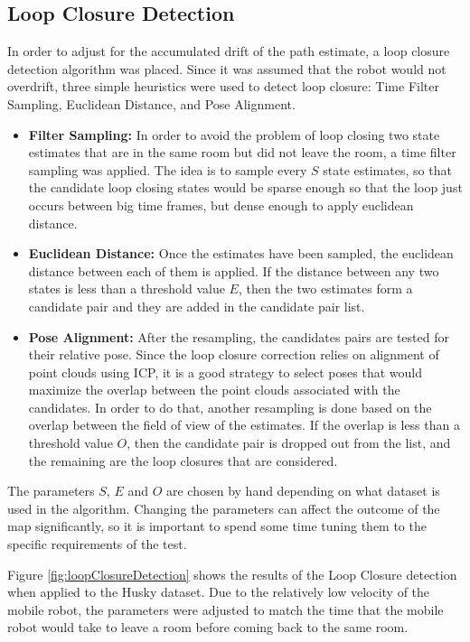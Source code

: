 \documentclass[12pt]{article}
\begin{document}
	\subsection{Loop Closure Detection}
	\label{subs:LoopCl}

In order to adjust for the accumulated drift of the path estimate, a loop closure detection algorithm was placed. Since it was assumed that the robot would not overdrift, three simple heuristics were used to detect loop closure: Time Filter Sampling, Euclidean Distance, and Pose Alignment. 

\begin{itemize}
\item \textbf{Filter Sampling:} In order to avoid the problem of loop closing two state estimates that are in the same room but did not leave the room, a time filter sampling was applied. The idea is to sample every $S$ state estimates, so that the candidate loop closing states would be sparse enough so that the loop just occurs between big time frames, but dense enough to apply euclidean distance.
\item \textbf{Euclidean Distance:} Once the estimates have been  sampled, the euclidean distance between each of them is applied. If the distance between any two states is less than a threshold value $E$, then the two estimates form a candidate pair and they are added in the candidate pair list.
\item \textbf{Pose Alignment:} After the resampling, the candidates pairs are tested for their relative pose. Since the loop closure correction relies on alignment of point clouds using ICP, it is a good strategy to select poses that would maximize the overlap between the point clouds associated with the candidates. In order to do that, another resampling is done based on the overlap between the field of view of the estimates. If the overlap is less than a threshold value $O$, then the candidate pair is dropped out from the list, and the remaining are the loop closures that are considered.
\end{itemize}
	
The parameters $S$, $E$ and $O$ are chosen by hand depending on what dataset is used in the algorithm. Changing the parameters can affect the outcome of the map significantly, so it is important to spend some time tuning them to the specific requirements of the test.
	
Figure \ref{fig:loopClosureDetection} shows the results of the Loop Closure detection when applied to the Husky dataset. Due to the relatively low velocity of the mobile robot, the parameters were adjusted to match the time that the mobile robot would take to leave a room before coming back to the same room.
\end{document}
